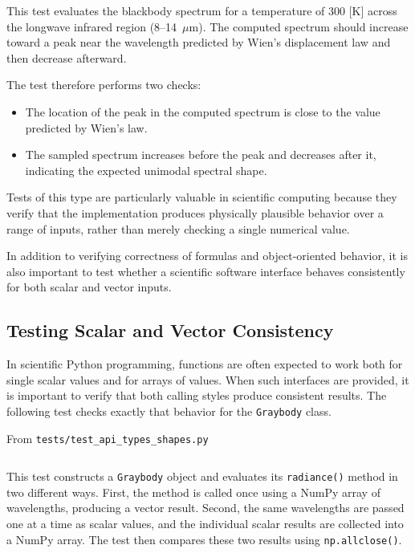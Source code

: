 This test evaluates the blackbody spectrum for a temperature of 300 [K] across the longwave infrared region (8--14~$\mu$m). The computed spectrum should increase toward a peak near the wavelength predicted by Wien's displacement law and then decrease afterward.

The test therefore performs two checks:
\begin{itemize}
\item The location of the peak in the computed spectrum is close to the value predicted by Wien's law.
\item The sampled spectrum increases before the peak and decreases after it, indicating the expected unimodal spectral shape.
\end{itemize}

Tests of this type are particularly valuable in scientific computing because they verify that the implementation produces physically plausible behavior over a range of inputs, rather than merely checking a single numerical value.

In addition to verifying correctness of formulas and object-oriented behavior, it is also important to test whether a scientific software interface behaves consistently for both scalar and vector inputs.

\subsection{Testing Scalar and Vector Consistency}

In scientific Python programming, functions are often expected to work both for single scalar values and for arrays of values.  When such interfaces are provided, it is important to verify that both calling styles produce consistent results.  The following test checks exactly that behavior for the \texttt{Graybody} class.

\vspace{0.5em}

From \texttt{tests/test\_api\_types\_shapes.py}
\inputminted[firstline=42,lastline=54]{python}{code/graybody/tests/test_api_types_shapes.py}

\vspace{0.5em}

This test constructs a \texttt{Graybody} object and evaluates its \texttt{radiance()} method in two different ways.  First, the method is called once using a NumPy array of wavelengths, producing a vector result.  Second, the same wavelengths are passed one at a time as scalar values, and the individual scalar results are collected into a NumPy array.  The test then compares these two results using \texttt{np.allclose()}.

